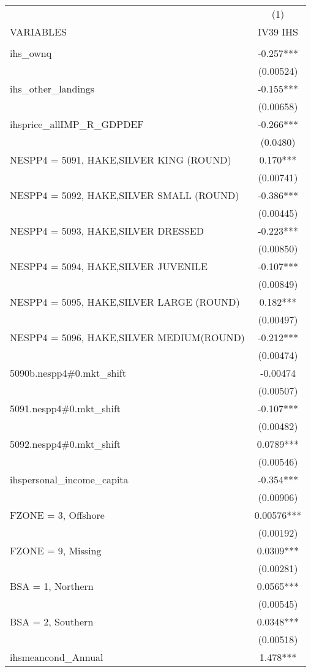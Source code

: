 \begin{tabular}{lc} \hline
 & (1) \\
VARIABLES & IV39 IHS \\ \hline
 &  \\
ihs\_ownq & -0.257*** \\
 & (0.00524) \\
ihs\_other\_landings & -0.155*** \\
 & (0.00658) \\
ihsprice\_allIMP\_R\_GDPDEF & -0.266*** \\
 & (0.0480) \\
NESPP4 = 5091, HAKE,SILVER KING (ROUND) & 0.170*** \\
 & (0.00741) \\
NESPP4 = 5092, HAKE,SILVER SMALL (ROUND) & -0.386*** \\
 & (0.00445) \\
NESPP4 = 5093, HAKE,SILVER DRESSED & -0.223*** \\
 & (0.00850) \\
NESPP4 = 5094, HAKE,SILVER JUVENILE & -0.107*** \\
 & (0.00849) \\
NESPP4 = 5095, HAKE,SILVER LARGE (ROUND) & 0.182*** \\
 & (0.00497) \\
NESPP4 = 5096, HAKE,SILVER MEDIUM(ROUND) & -0.212*** \\
 & (0.00474) \\
5090b.nespp4\#0.mkt\_shift & -0.00474 \\
 & (0.00507) \\
5091.nespp4\#0.mkt\_shift & -0.107*** \\
 & (0.00482) \\
5092.nespp4\#0.mkt\_shift & 0.0789*** \\
 & (0.00546) \\
ihspersonal\_income\_capita & -0.354*** \\
 & (0.00906) \\
FZONE = 3, Offshore & 0.00576*** \\
 & (0.00192) \\
FZONE = 9, Missing & 0.0309*** \\
 & (0.00281) \\
BSA = 1, Northern & 0.0565*** \\
 & (0.00545) \\
BSA = 2, Southern & 0.0348*** \\
 & (0.00518) \\
ihsmeancond\_Annual & 1.478*** \\

\end{tabular}
